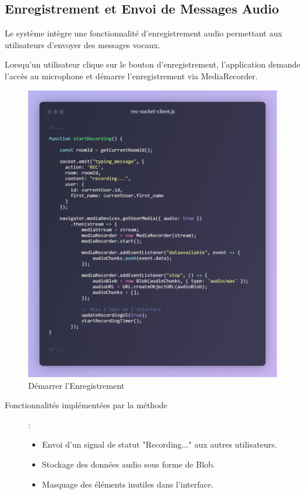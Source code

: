 \subsection*{Enregistrement et Envoi de Messages Audio}

Le système intègre une fonctionnalité d’enregistrement audio permettant aux utilisateurs d’envoyer des messages vocaux.

\vspace{0.35cm}

Lorsqu'un utilisateur clique sur le bouton d'enregistrement, l’application demande l'accès au microphone et démarre l’enregistrement via MediaRecorder.

\begin{figure}[H]
    \centering
    \includegraphics[width=15cm]{assets/annexes/snippet (29).png}
    \caption{ Démarrer l’Enregistrement}
\end{figure}

\begin{description}
    \item[Fonctionnalités implémentées par la méthode] :
    \begin{itemize}
        \item Envoi d’un signal de statut "Recording..." aux autres utilisateurs.
        \item Stockage des données audio sous forme de Blob.
        \item Masquage des éléments inutiles dans l'interface.
    \end{itemize}
\end{description}

